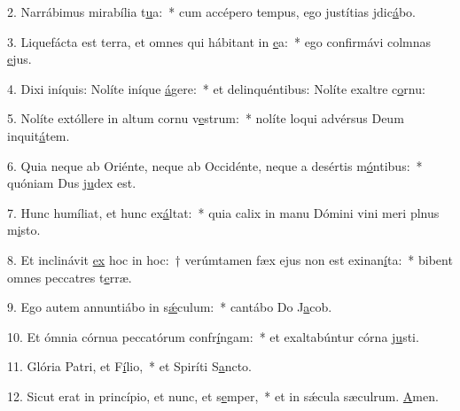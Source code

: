 2. Narrábimus mirabília t\uline{u}a:~* cum accépero tempus, ego justítias jdic\uline{á}bo.\par 
3. Liquefácta est terra, et omnes qui hábitant in \uline{e}a:~* ego confirmávi colmnas \uline{e}jus.\par 
4. Dixi iníquis: Nolíte iníque \uline{á}gere:~* et delinquéntibus: Nolíte exaltre c\uline{o}rnu:\par 
5. Nolíte extóllere in altum cornu v\uline{e}strum:~* nolíte loqui advérsus Deum inquit\uline{á}tem.\par 
6. Quia neque ab Oriénte, neque ab Occidénte, neque a desértis m\uline{ó}ntibus:~* quóniam Dus j\uline{u}dex est.\par 
7. Hunc humíliat, et hunc ex\uline{á}ltat:~* quia calix in manu Dómini vini meri plnus m\uline{i}sto.\par 
8. Et inclinávit \uline{ex} hoc in hoc:~† verúmtamen fæx ejus non est exinan\uline{í}ta:~* bibent omnes peccatres t\uline{e}rræ.\par 
9. Ego autem annuntiábo in s\uline{ǽ}culum:~* cantábo Do J\uline{a}cob.\par 
10. Et ómnia córnua peccatórum confr\uline{í}ngam:~* et exaltabúntur córna j\uline{u}sti.\par 
11. Glória Patri, et F\uline{í}lio,~* et Spiríti S\uline{a}ncto.\par 
12. Sicut erat in princípio, et nunc, et s\uline{e}mper,~* et in sǽcula sæculrum. \uline{A}men.\par 
